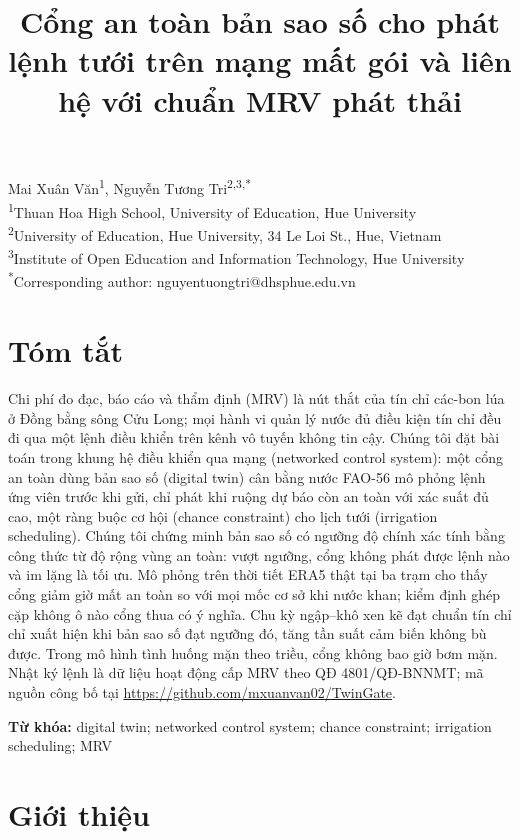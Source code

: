 \documentclass[10pt]{article}
\title{\bfseries Cổng an toàn bản sao số cho phát lệnh tưới trên mạng mất gói và liên hệ với chuẩn MRV phát thải}
\author{}
\date{}
\begin{document}
\maketitle
\vspace{-3em}

{\centering
Mai Xuân Văn\textsuperscript{1}, Nguyễn Tương Tri\textsuperscript{2,3,*}\\
\small \textsuperscript{1}Thuan Hoa High School, University of Education, Hue University\\
\small \textsuperscript{2}University of Education, Hue University, 34 Le Loi St., Hue, Vietnam\\
\small \textsuperscript{3}Institute of Open Education and Information Technology, Hue University\\
\small \textsuperscript{*}Corresponding author: nguyentuongtri@dhsphue.edu.vn\\[6pt]
}

\section*{Tóm tắt}

Chi phí đo đạc, báo cáo và thẩm định (MRV) là nút thắt của tín chỉ các-bon lúa ở Đồng bằng sông Cửu Long; mọi hành vi quản lý nước đủ điều kiện tín chỉ đều đi qua một lệnh điều khiển trên kênh vô tuyến không tin cậy. Chúng tôi đặt bài toán trong khung hệ điều khiển qua mạng (networked control system): một cổng an toàn dùng bản sao số (digital twin) cân bằng nước FAO-56 mô phỏng lệnh ứng viên trước khi gửi, chỉ phát khi ruộng dự báo còn an toàn với xác suất đủ cao, một ràng buộc cơ hội (chance constraint) cho lịch tưới (irrigation scheduling). Chúng tôi chứng minh bản sao số có ngưỡng độ chính xác tính bằng công thức từ độ rộng vùng an toàn: vượt ngưỡng, cổng không phát được lệnh nào và im lặng là tối ưu. Mô phỏng trên thời tiết ERA5 thật tại ba trạm cho thấy cổng giảm giờ mất an toàn so với mọi mốc cơ sở khi nước khan; kiểm định ghép cặp không ô nào cổng thua có ý nghĩa. Chu kỳ ngập--khô xen kẽ đạt chuẩn tín chỉ chỉ xuất hiện khi bản sao số đạt ngưỡng đó, tăng tần suất cảm biến không bù được. Trong mô hình tình huống mặn theo triều, cổng không bao giờ bơm mặn. Nhật ký lệnh là dữ liệu hoạt động cấp MRV theo QĐ 4801/QĐ-BNNMT; mã nguồn công bố tại \url{https://github.com/mxuanvan02/TwinGate}.

\noindent\textbf{Từ khóa:} digital twin; networked control system; chance constraint; irrigation scheduling; MRV

\section{Giới thiệu}
\end{document}
